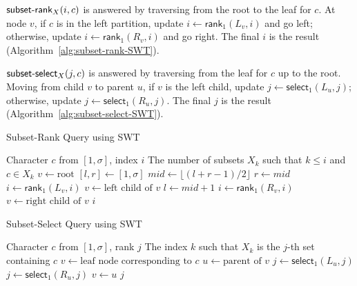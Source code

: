 $\textsf{subset-rank}_X(i, c)$ is answered by traversing from the root to the leaf for $c$. At node $v$, if $c$ is in the left partition, update $i \leftarrow \textsf{rank}_1(L_v, i)$ and go left; otherwise, update $i \leftarrow \textsf{rank}_1(R_v, i)$ and go right. The final $i$ is the result (Algorithm~\ref{alg:subset-rank-SWT}).

$\textsf{subset-select}_X(j, c)$ is answered by traversing from the leaf for $c$ up to the root. Moving from child $v$ to parent $u$, if $v$ is the left child, update $j \leftarrow \textsf{select}_1(L_u, j)$; otherwise, update $j \leftarrow \textsf{select}_1(R_u, j)$. The final $j$ is the result (Algorithm~\ref{alg:subset-select-SWT}).


\begin{algorithm}[h]
    \caption{Subset-Rank Query using SWT {\cite{SubsetWT}}}
    \label{alg:subset-rank-SWT}
    \small
    \begin{algorithmic}[1] %
        \Require Character $c$ from $[1, \sigma]$, index $i$
        \Ensure The number of subsets $X_k$ such that $k \leq i$ and $c \in X_k$
        \State $v \gets \text{root}$
        \State $[l, r] \gets [1, \sigma]$
        \State $mid \gets \lfloor (l+r-1)/2 \rfloor$
        \State $r \gets mid$
        \State $i \gets \textsf{rank}_1(L_v, i)$
        \State $v \gets \text{left child of } v$
        \Else
        \State $l \gets mid + 1$
        \State $i \gets \textsf{rank}_1(R_v, i)$
        \State $v \gets \text{right child of } v$
        \EndIf
        \EndWhile
        \State \Return $i$
        \EndFunction
    \end{algorithmic}
\end{algorithm}

\begin{algorithm}[h]
    \caption{Subset-Select Query using SWT {\cite{SubsetWT}}}
    \label{alg:subset-select-SWT}
    \small
    \begin{algorithmic}[1] %
        \Require Character $c$ from $[1, \sigma]$, rank $j$
        \Ensure The index $k$ such that $X_k$ is the $j$-th set containing $c$
        \State $v \gets \text{leaf node corresponding to } c$
        \State $u \gets \text{parent of } v$
        \State $j \gets \textsf{select}_1(L_u, j)$
        \Else
        \State $j \gets \textsf{select}_1(R_u, j)$
        \EndIf
        \State $v \gets u$
        \EndWhile
        \State \Return $j$
        \EndFunction
    \end{algorithmic}
\end{algorithm}

